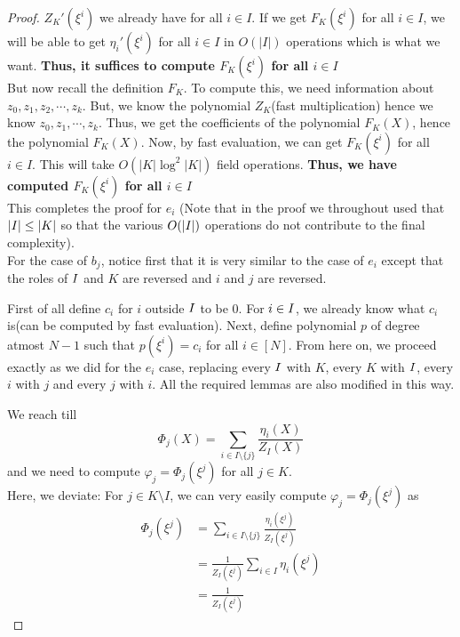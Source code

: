 \begin{proof}
    $Z_K'(\xi^i)$ we already have for all $i \in I$.
    If we get $F_K(\xi^i)$ for all $i \in I$, we will be able to get $\eta_i'(\xi^i)$ for all $i \in I$ in $O(|I|)$ operations which is what we want.
    \textbf{Thus, it suffices to compute $F_K(\xi^i)$ for all $i \in I$}\\

    But now recall the definition $F_K$. To compute this, we need information about $z_0, z_1, z_2, \cdots, z_k$.
    But, we know the polynomial $Z_K$(fast multiplication) hence we know $z_0, z_1, \cdots, z_{k}$.
    Thus, we get the coefficients of the polynomial $F_K(X)$, hence the polynomial $F_K(X)$.
    Now, by fast evaluation, we can get $F_K(\xi^i)$ for all $i \in I$. This will take $O(|K| \log^2|K|)$ field operations.
    \textbf{Thus, we have computed $F_K(\xi^i)$ for all $i \in I$}\\

    This completes the proof for $e_i$ (Note that in the proof we throughout used that $|I| \leq |K|$ so that the various $O(|I|)$ operations do not contribute to the final complexity).\\
    For the case of $b_j$, notice first that it is very similar to the case of $e_i$ except that the roles of $I$ and $K$ are reversed and $i$ and $j$ are reversed.

    First of all define $c_i$ for $i$ outside $I$ to be 0. For $i \in I$, we already know what $c_i$ is(can be computed by fast evaluation).
    Next, define polynomial $p$ of degree atmost $N-1$ such that $p(\xi^i)=c_i$ for all $i \in [N]$.
    From here on, we proceed exactly as we did for the $e_i$ case, replacing every $I$ with $K$, every $K$ with $I$, every $i$ with $j$ and every $j$ with $i$.
    All the required lemmas are also modified in this way.

    We reach till
    $$\Phi_j(X)=\sum_{i\in I\setminus \{j\}} \frac{\eta_i(X)}{Z_I(X)}$$
    and we need to compute $\varphi_j=\Phi_j(\xi^j)$ for all $j \in K$.\\

    Here, we deviate: For $j \in K\setminus I$, we can very easily compute $\varphi_j=\Phi_j(\xi^j)$ as
    \begin{align*}
        \Phi_j(\xi^j)&=\sum_{i\in I\setminus \{j\}} \frac{\eta_i(\xi^j)}{Z_I(\xi^j)}\\
        &=\frac{1}{Z_I(\xi^j)} \sum_{i\in I}\eta_i(\xi^j)\\
        &=\frac{1}{Z_I(\xi^j)}
    \end{align*}


\end{proof}
